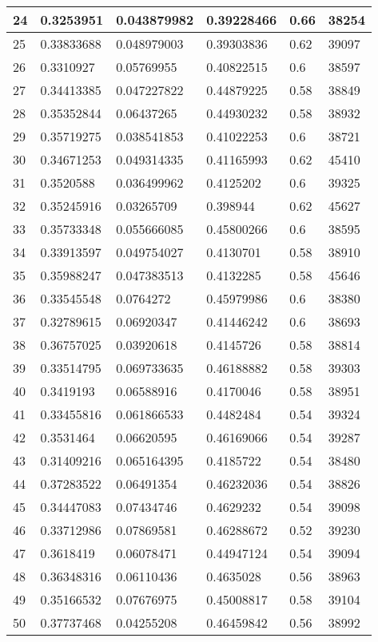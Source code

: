 \begin{longtable}{|l|l|l|l|l|l|}
24 & 0.3253951 & 0.043879982 & 0.39228466 & 0.66 & 38254 \\ \hline 
25 & 0.33833688 & 0.048979003 & 0.39303836 & 0.62 & 39097 \\ \hline 
26 & 0.3310927 & 0.05769955 & 0.40822515 & 0.6 & 38597 \\ \hline 
27 & 0.34413385 & 0.047227822 & 0.44879225 & 0.58 & 38849 \\ \hline 
28 & 0.35352844 & 0.06437265 & 0.44930232 & 0.58 & 38932 \\ \hline 
29 & 0.35719275 & 0.038541853 & 0.41022253 & 0.6 & 38721 \\ \hline 
30 & 0.34671253 & 0.049314335 & 0.41165993 & 0.62 & 45410 \\ \hline 
31 & 0.3520588 & 0.036499962 & 0.4125202 & 0.6 & 39325 \\ \hline 
32 & 0.35245916 & 0.03265709 & 0.398944 & 0.62 & 45627 \\ \hline 
33 & 0.35733348 & 0.055666085 & 0.45800266 & 0.6 & 38595 \\ \hline 
34 & 0.33913597 & 0.049754027 & 0.4130701 & 0.58 & 38910 \\ \hline 
35 & 0.35988247 & 0.047383513 & 0.4132285 & 0.58 & 45646 \\ \hline 
36 & 0.33545548 & 0.0764272 & 0.45979986 & 0.6 & 38380 \\ \hline 
37 & 0.32789615 & 0.06920347 & 0.41446242 & 0.6 & 38693 \\ \hline 
38 & 0.36757025 & 0.03920618 & 0.4145726 & 0.58 & 38814 \\ \hline 
39 & 0.33514795 & 0.069733635 & 0.46188882 & 0.58 & 39303 \\ \hline 
40 & 0.3419193 & 0.06588916 & 0.4170046 & 0.58 & 38951 \\ \hline 
41 & 0.33455816 & 0.061866533 & 0.4482484 & 0.54 & 39324 \\ \hline 
42 & 0.3531464 & 0.06620595 & 0.46169066 & 0.54 & 39287 \\ \hline 
43 & 0.31409216 & 0.065164395 & 0.4185722 & 0.54 & 38480 \\ \hline 
44 & 0.37283522 & 0.06491354 & 0.46232036 & 0.54 & 38826 \\ \hline 
45 & 0.34447083 & 0.07434746 & 0.4629232 & 0.54 & 39098 \\ \hline 
46 & 0.33712986 & 0.07869581 & 0.46288672 & 0.52 & 39230 \\ \hline 
47 & 0.3618419 & 0.06078471 & 0.44947124 & 0.54 & 39094 \\ \hline 
48 & 0.36348316 & 0.06110436 & 0.4635028 & 0.56 & 38963 \\ \hline 
49 & 0.35166532 & 0.07676975 & 0.45008817 & 0.58 & 39104 \\ \hline 
50 & 0.37737468 & 0.04255208 & 0.46459842 & 0.56 & 38992 \\ \hline 
\end{longtable}